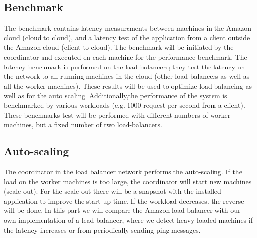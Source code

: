 \documentclass[paper=a4, fontsize=11pt]{scrartcl} %
\numberwithin{equation}{section} %
\numberwithin{figure}{section} %
\numberwithin{table}{section} %
\begin{document}
\subsection{Benchmark}

The benchmark contains latency measurements between machines in the Amazon cloud (cloud to cloud), and a latency test of the application from a client outside the Amazon cloud (client to cloud). The benchmark will be initiated by the coordinator and executed on each machine for the performance benchmark. The latency benchmark is performed on the load-balancers; they test the latency on the network to all running machines in the cloud (other load balancers as well as all the worker machines). These results will be used to optimize load-balancing as well as for the auto scaling.
Additionally,the performance of the system is benchmarked by various workloads (e.g. 1000 request per second from a client). These benchmarks test will be performed with different numbers of worker machines, but a fixed number of two load-balancers.

\subsection{Auto-scaling}

The coordinator in the load balancer network performs the auto-scaling. If the load on the worker machines is too large, the coordinator will start new machines (scale-out). For the scale-out there will be a snapshot with the installed application to improve the start-up time. 
If the workload decreases, the reverse will be done.
In this part we will compare the Amazon load-balancer with our own implementation of a load-balancer, where we detect heavy-loaded machines if the latency increases or from periodically sending ping messages.
\end{document}
